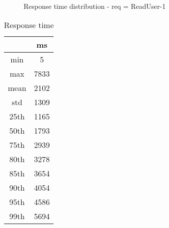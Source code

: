 \begin{minipage}{0.75\linewidth}
\begin{figure}[h]
\begin{adjustbox}{max width=1.0\linewidth, keepaspectratio}
  \end{adjustbox}
  \caption{Response time distribution - req = ReadUser-1}
\end{figure}
\end{minipage}\hfill\begin{minipage}{0.18\linewidth}
\begin{table}[h]
\begin{tabular}{|cc|}
\hline
\textbf{} & \textbf{ms}\\ \hline
 \Xhline{0.005\arrayrulewidth}
min & 5\\
 \Xhline{0.005\arrayrulewidth}
max & 7833\\
 \Xhline{0.005\arrayrulewidth}
mean & 2102\\
 \Xhline{0.005\arrayrulewidth}
std & 1309\\
\hline
\hline
 \Xhline{0.005\arrayrulewidth}
25th & 1165\\
 \Xhline{0.005\arrayrulewidth}
50th & 1793\\
 \Xhline{0.005\arrayrulewidth}
75th & 2939\\
 \Xhline{0.005\arrayrulewidth}
80th & 3278\\
 \Xhline{0.005\arrayrulewidth}
85th & 3654\\
 \Xhline{0.005\arrayrulewidth}
90th & 4054\\
 \Xhline{0.005\arrayrulewidth}
95th & 4586\\
 \Xhline{0.005\arrayrulewidth}
99th & 5694\\
\hline
\end{tabular}
\caption{Response time}
\end{table}
\end{minipage}\hfill